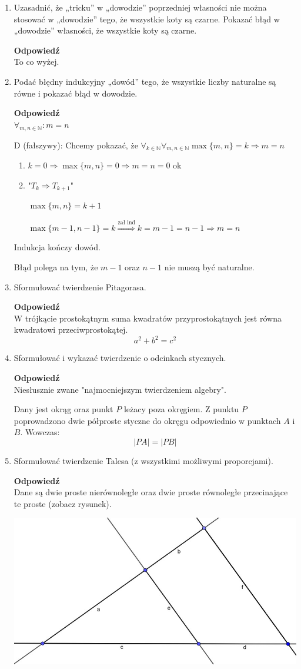\documentclass[12pt,a4paper]{article}
\newcounter{twierdzenie}
\theoremstyle{break}
\newcommand{\Odp}[1]{
		\begin{mdframed}[style=zadanie]
			\textbf{Odpowiedź}\\
			#1
		\end{mdframed}
	}
\begin{document}
\begin{enumerate}[1.]
{		Błąd polega na tym, że z $T_1\Rightarrow T_2$ mamy możliwą zamianę koloru oczu, ponieważ wymieniamy cały zbiór.
	}
	
	\item Uzasadnić, że „tricku” w „dowodzie” poprzedniej własności nie można stosować w „dowodzie” tego, że wszystkie koty są czarne. Pokazać błąd w „dowodzie” własności, że wszystkie koty są czarne.
	\Odp{
		To co wyżej.
	}
	
	\item Podać błędny indukcyjny „dowód” tego, że wszystkie liczby naturalne są równe i pokazać błąd w dowodzie.
	\Odp{
		$\forall_{m,n\in\mathbb{N}}: m=n$
		
		D (fałszywy): Chcemy pokazać, że $\forall_{k\in \mathbb{N}} \forall_{m,n\in\mathbb{N}} \max\{m,n\}=k \Rightarrow m=n$ 
			
			\begin{enumerate}[$1^\circ$]
				\item $k=0 \Rightarrow \max\{m,n\}=0 \Rightarrow m=n=0$ ok
				\item "$T_k\Rightarrow T_{k+1}$"
				
				$\max\{m,n\}=k+1$
				
				$\max\{m-1,n-1\}=k \overset{\text{zał ind}}{\Rightarrow} k=m-1=n-1 \Rightarrow m=n$
			\end{enumerate}
		Indukcja kończy dowód.
		
		Błąd polega na tym, że $m-1$ oraz $n-1$ nie muszą być naturalne.
	}
	
	\item Sformułować twierdzenie Pitagorasa.
	\Odp{
		W trójkącie prostokątnym suma kwadratów przyprostokątnych jest równa kwadratowi przeciwprostokątej.
		$$a^2+b^2=c^2$$
	}
	\newpage
	\item Sformułować i wykazać twierdzenie o odcinkach stycznych.
	\Odp{
		Niesłusznie zwane "najmocniejszym twierdzeniem algebry".
		
		Dany jest okrąg oraz punkt $P$ leżacy poza okręgiem. Z punktu $P$ poprowadzono dwie półproste styczne do okręgu odpowiednio w punktach $A$ i $B$. Wowczas:	$$|PA|=|PB|$$
		
	}
	\item Sformułować twierdzenie Talesa (z wszystkimi możliwymi proporcjami).
	\Odp{
		Dane są dwie proste nierównoległe oraz dwie proste równoległe przecinające te proste (zobacz rysunek).
		
		\includegraphics[width=0.7\linewidth]{tales.jpeg}
		
}
\end{enumerate}
\end{document}
